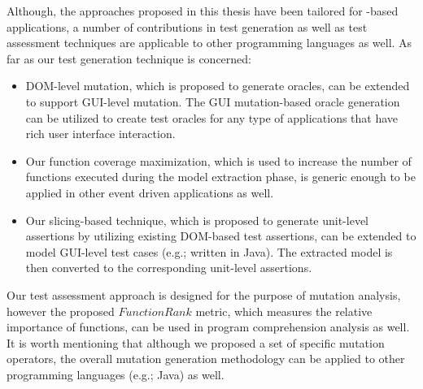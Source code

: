 Although, the approaches proposed in this thesis have been tailored for \javascript-based applications, a number of contributions in test generation as well as test assessment techniques are applicable to other programming languages as well. As far as our test generation technique is concerned:
\begin{itemize}
\item DOM-level mutation, which is proposed to generate oracles, can be extended to support GUI-level mutation. The GUI mutation-based oracle generation can be utilized to create test oracles for any type of applications that have rich user interface interaction. 
\item Our function coverage maximization, which is used to increase the number of functions executed during the model extraction phase, is generic enough to be applied in other event driven applications as well. 
\item Our slicing-based technique, which is proposed to generate unit-level assertions by utilizing existing DOM-based test assertions, can be extended to model GUI-level test cases (e.g.; written in Java). The extracted model is then converted to the corresponding unit-level assertions.
\end{itemize}
Our test assessment approach is designed for the purpose of mutation analysis, however the proposed $FunctionRank$ metric, which measures the relative importance of functions, can be used in program comprehension analysis as well. It is worth mentioning that although we proposed a set of specific \javascript mutation operators, the overall mutation generation methodology can be applied to other programming languages (e.g.; Java) as well.     
  




